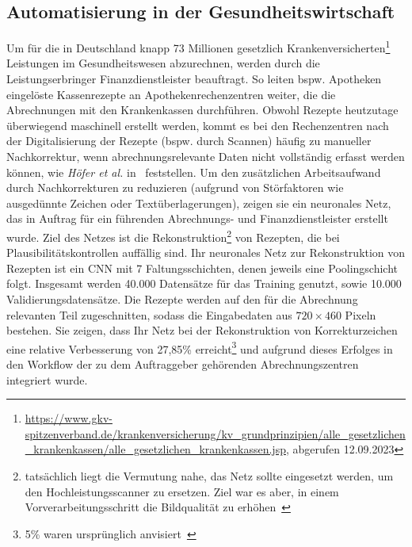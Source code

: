 \subsection{Automatisierung in der Gesundheitswirtschaft}
Um für die in Deutschland knapp 73 Millionen gesetzlich Krankenversicherten\footnote{
    \url{https://www.gkv-spitzenverband.de/krankenversicherung/kv_grundprinzipien/alle_gesetzlichen_krankenkassen/alle_gesetzlichen_krankenkassen.jsp}, abgerufen 12.09.2023
} Leistungen im Gesundheitswesen abzurechnen, werden durch die Leistungserbringer Finanzdienstleister beauftragt. So leiten bspw. Apotheken eingelöste Kassenrezepte an Apothekenrechenzentren weiter, die die Abrechnungen mit den Krankenkassen durchführen. Obwohl Rezepte heutzutage überwiegend maschinell erstellt werden, kommt es bei den Rechenzentren nach der Digitalisierung der Rezepte (bspw. durch Scannen) häufig zu manueller Nachkorrektur, wenn abrechnungsrelevante Daten nicht vollständig erfasst werden können, wie \textit{Höfer et al.} in~\cite[698]{HWN22} feststellen. Um den zusätzlichen Arbeitsaufwand durch Nachkorrekturen zu reduzieren (aufgrund von Störfaktoren wie ausgedünnte Zeichen oder Textüberlagerungen), zeigen sie ein neuronales Netz, das in Auftrag für ein führenden Abrechnungs- und Finanzdienstleister erstellt wurde. Ziel des Netzes ist die Rekonstruktion\footnote{
    tatsächlich liegt die Vermutung nahe, das Netz sollte eingesetzt werden, um den Hochleistungsscanner zu ersetzen. Ziel war es aber, in einem Vorverarbeitungsschritt die Bildqualität zu erhöhen~\cite[698]{HWN22}
} von Rezepten, die bei Plausibilitätskontrollen auffällig sind.
Ihr neuronales Netz zur Rekonstruktion von Rezepten ist ein CNN mit 7 Faltungsschichten, denen jeweils eine Poolingschicht folgt. Insgesamt werden 40.000 Datensätze für das Training genutzt, sowie 10.000 Validierungsdatensätze. Die Rezepte werden auf den für die Abrechnung relevanten Teil zugeschnitten, sodass die Eingabedaten aus $720 \times 460$ Pixeln bestehen. Sie zeigen, dass Ihr Netz bei der Rekonstruktion von Korrekturzeichen eine relative Verbesserung von 27,85\% erreicht\footnote{
    5\% waren ursprünglich anvisiert~\cite[711]{HWN22}
} und aufgrund dieses Erfolges in den  Workflow der zu dem Auftraggeber gehörenden Abrechnungszentren integriert wurde.


